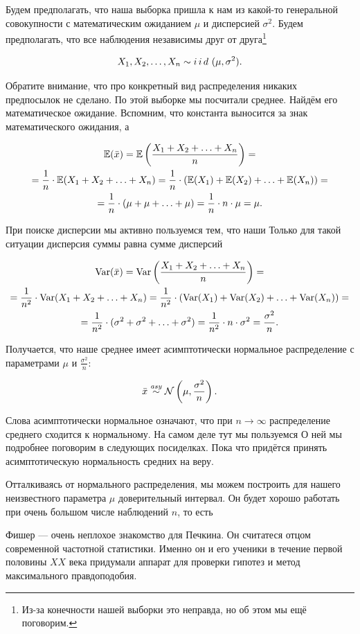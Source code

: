 \documentclass[12pt, a4paper, oneside]{article}
\begin{document}
\begin{sol} 
Будем предполагать, что наша выборка пришла к нам из какой-то генеральной совокупности с математическим ожиданием $\mu$ и дисперсией $\sigma^2$. Будем предполагать, что все наблюдения независимы друг от друга\footnote{Из-за конечности нашей выборки это неправда, но об этом мы ещё поговорим.}

\[
X_1, X_2, \ldots, X_n \sim i\,i\,d\,\, (\mu, \sigma^2).
\]

Обратите внимание, что про конкретный вид распределения никаких предпосылок не сделано. По этой выборке мы посчитали среднее. Найдём его математическое ожидание. Вспомним, что константа выносится за знак математического ожидания, а 

\begin{multline*}
\mathbb{E}(\bar{x}) = \mathbb{E} \left(\frac{X_1 + X_2 + \ldots + X_n}{n}\right) = \\ = \frac{1}{n} \cdot \mathbb{E}(X_1 + X_2 + \ldots + X_n) = \frac{1}{n} \cdot (\mathbb{E}(X_1) + \mathbb{E}(X_2) + \ldots + \mathbb{E}(X_n))  = \\ = \frac{1}{n} \cdot (\mu + \mu + \ldots + \mu) = \frac{1}{n} \cdot n \cdot \mu = \mu.
\end{multline*}

При поиске дисперсии мы активно пользуемся тем, что наши  Только для такой ситуации дисперсия суммы равна сумме дисперсий

\begin{multline*}
\operatorname{Var}(\bar{x}) = \operatorname{Var} \left(\frac{X_1 + X_2 + \ldots + X_n}{n}\right) = \\ = \frac{1}{n^2} \cdot \operatorname{Var}(X_1 + X_2 + \ldots + X_n) = \frac{1}{n^2} \cdot (\operatorname{Var}(X_1) + \operatorname{Var}(X_2) + \ldots + \operatorname{Var}(X_n))  = \\ = \frac{1}{n^2} \cdot (\sigma^2 + \sigma^2 + \ldots + \sigma^2) = \frac{1}{n^2} \cdot n \cdot \sigma^2 = \frac{\sigma^2}{n}.
\end{multline*}


Получается, что наше среднее имеет асимптотически нормальное распределение с параметрами $\mu$ и $\frac{\sigma^2}{n}$:

$$
\bar{x} \overset{\text{\textit{asy}}}{\sim} \mathcal{N} \left(\mu, \frac{\sigma^2}{n} \right).
$$

Слова асимптотически нормальное означают, что при $n \to \infty$ распределение среднего сходится к нормальному. На самом деле тут мы пользуемся  О ней мы подробнее поговорим в следующих посиделках. Пока что придётся принять асимптотическую нормальность средних на веру.  

Отталкиваясь от нормального распределения, мы можем построить для нашего неизвестного параметра $\mu$ доверительный интервал. Он будет хорошо работать при очень большом числе наблюдений $n$, то есть 

Фишер --- очень неплохое знакомство для Печкина. Он считатеся отцом современной частотной статистики. Именно он и его ученики в течение первой половины $XX$ века придумали аппарат для проверки гипотез и метод максимального правдоподобия.
\end{sol} 
\end{document}
